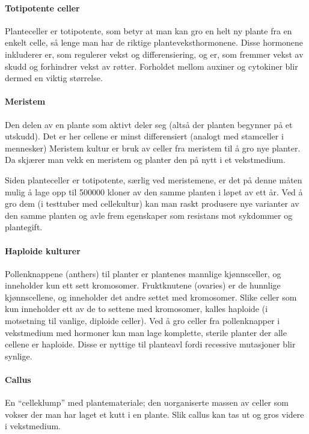 \paragraph{Totipotente celler} Planteceller er totipotente, som betyr at man kan gro en helt ny plante fra en enkelt celle, så lenge man har de riktige planteveksthormonene. Disse hormonene inkluderer er, som regulerer vekst og differensiering, og er, som fremmer vekst av skudd og forhindrer vekst av røtter. Forholdet mellom auxiner og cytokiner blir dermed en viktig størrelse.

\paragraph{Meristem} Den delen av en plante som aktivt deler seg (altså der planten begynner på et utskudd). Det er her cellene er minst differensiert (analogt med stamceller i mennesker) Meristem kultur er bruk av celler fra meristem til å gro nye planter. Da skjærer man vekk en meristem og planter den på nytt i et vekstmedium.

Siden planteceller er totipotente, særlig ved meristemene, er det på denne måten mulig å lage opp til 500000 kloner av den samme planten i løpet av ett år. Ved å gro dem  (i testtuber med cellekultur) kan man raskt produsere nye varianter av den samme planten og avle frem egenskaper som resistans mot sykdommer og plantegift.

\paragraph{Haploide kulturer} Pollenknappene (anthers) til planter er plantenes mannlige kjønnsceller, og inneholder kun ett sett kromosomer. Fruktknutene (ovaries) er de hunnlige kjønnscellene, og inneholder det andre settet med kromosomer. Slike celler som kun  inneholder ett av de to settene med kromosomer, kalles haploide (i motsetning til vanlige, diploide celler). Ved å gro celler fra pollenknapper i vekstmedium med hormoner kan man lage komplette, sterile planter der alle cellene er haploide. Disse er nyttige til planteavl fordi recessive mutasjoner blir synlige.

\paragraph{Callus} En ``celleklump'' med plantemateriale; den uorganiserte massen av celler som vokser der man har laget et kutt i en plante. Slik callus kan tas ut og gros videre i vekstmedium. 

